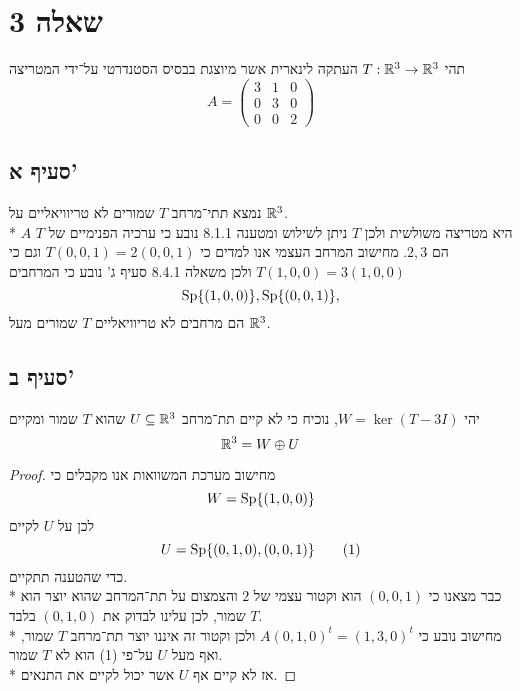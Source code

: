 \section{שאלה 3}
תהי $T : \mathbb{R}^3 \to \mathbb{R}^3$ העתקה לינארית אשר מיוצגת בבסיס הסטנדרטי על־ידי המטריצה
\[
	A = \begin{pmatrix}
		3 & 1 & 0 \\
		0 & 3 & 0 \\
		0 & 0 & 2
	\end{pmatrix}
\]
\subsection{סעיף א'}
נמצא תתי־מרחב $T$ שמורים לא טריוויאליים על $\mathbb{R}^3$. \\*
$A$ היא מטריצה משולשית ולכן $T$ ניתן לשילוש ומטענה 8.1.1 נובע כי ערכיה הפנימיים של $T$ הם $2, 3$.
מחישוב המרחב העצמי אנו למדים כי $T(0, 0, 1) = 2(0, 0, 1)$ וגם כי $T(1, 0, 0) = 3(1, 0, 0)$ ולכן משאלה 8.4.1 סעיף ג' נובע כי המרחבים
\[
	\operatorname{Sp}\{ (1, 0, 0) \},
	\operatorname{Sp}\{ (0, 0, 1) \},
\]
הם מרחבים לא טריוויאליים $T$ שמורים מעל $\mathbb{R}^3$.

\subsection{סעיף ב'}
יהי $W = \ker(T - 3I)$, נוכיח כי לא קיים תת־מרחב $U \subseteq \mathbb{R}^3$ שהוא $T$ שמור ומקיים
\[
	\mathbb{R}^3 = W \oplus U
\]
\begin{proof}
	מחישוב מערכת המשוואות אנו מקבלים כי
	\[
		W = \operatorname{Sp}\{ (1, 0, 0) \}
	\]
	לכן על $U$ לקיים
	\[
		U = \operatorname{Sp}\{ (0, 1, 0), (0, 0, 1) \} \tag{1}
	\]
	כדי שהטענה תתקיים. \\*
	כבר מצאנו כי $(0, 0, 1)$ הוא וקטור עצמי של $2$ והצמצום על תת־המרחב שהוא יוצר הוא $T$ שמור, לכן עלינו לבדוק את $(0, 1, 0)$ בלבד. \\*
	מחישוב נובע כי $A {(0, 1, 0)}^t = {(1, 3, 0)}^t$ ולכן וקטור זה איננו יוצר תת־מרחב $T$ שמור, ואף מעל $U$ על־פי (1) הוא לא $T$ שמור. \\*
	אז לא קיים אף $U$ אשר יכול לקיים את התנאים.
\end{proof}


